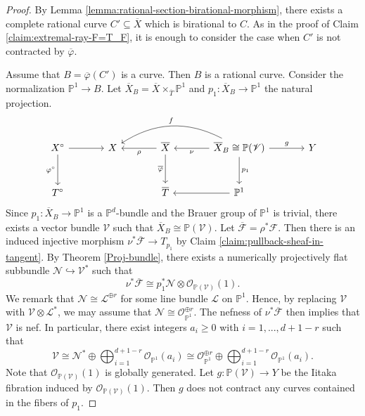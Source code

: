 \documentclass[english,reqno]{amsart}
\newcommand\bbP{{\mathbb P}}
\newcommand\sF{{\mathscr F}}
\newcommand\sG{{\mathscr G}}
\newcommand\sL{{\mathscr L}}
\newcommand\sN{{\mathscr N}}
\newcommand\sO{{\mathscr O}}
\newcommand\sV{{\mathscr V}}
\theoremstyle{plain}
\theoremstyle{definition}
\numberwithin{equation}{section} %
\begin{document}
\begin{proof}
	By Lemma \ref{lemma:rational-section-birational-morphism}, there exists a complete rational curve $C'\subseteq \overline{X}$  which is birational to $C$.  As in the proof of Claim \ref{claim:extremal-ray-F=T_F}, it is enough to consider the case when $C'$ is not contracted by $\overline{\varphi}$.
	
	Assume that $B=\overline{\varphi}(C')$ is a curve. Then $B$ is a rational curve.  Consider the normalization $\bbP^1 \to B$.
	Let $\overline{X}_B = \overline{X}\times_{\overline{T}} \bbP^1$  and $p_1\colon \overline{X}_B\rightarrow \bbP^1$ the natural projection.
	\[\begin{tikzcd}[column sep=large, row sep=large]
	X^\circ \dar[swap]{\varphi^\circ}\rar &
	X & \overline{X} \lar{\rho}\dar[swap]{\overline{\varphi}} & \overline{X}_B \cong\bbP(\sV)\dar{p_1}\lar{\nu}\arrow[bend right]{ll}[swap]{f} \rar{g} & Y \\
	T^\circ & &
	\overline{T} & \bbP^1\lar  &
	\end{tikzcd}\]
	Since $p_1\colon \overline{X}_B\rightarrow \bbP^1$ is a $\bbP^d$-bundle and the Brauer group of $\bbP^1$ is trivial, there exists a vector bundle $\sV$ such that $\overline{X}_B \cong \bbP(\sV)$.
	Let $\overline{\sF}=\rho^*\sF$.
	Then there is an induced injective  morphism $\nu^*\overline{\sF}\rightarrow T_{p_1}$   by Claim \ref{claim:pullback-sheaf-in-tangent}.
	By Theorem \ref{Proj-bundle}, there exists a numerically projectively flat subbundle $\sN\hookrightarrow \sV^*$ such that $$\nu^*\overline{\sF}\cong  p_1^*\sN\otimes\sO_{\bbP(\sV)}(1).$$
	We remark that  $\sN \cong \sL^{\oplus r}$ for some line bundle $\sL$ on $\bbP^1$. Hence, by replacing $\sV$ with $\sV\otimes \sL^*$, we may assume that $\sN\cong \sO_{\bbP^1}^{\oplus r}$.
	The nefness of $\nu^*\overline{\sF}$ then implies that $\sV$ is nef. In particular, there exist  integers $a_i\geqslant 0$ with $i=1,...,d+1-r$ such that
	\[
	\sV  \cong  \sN^*\oplus \bigoplus_{i=1}^{d+1-r}\sO_{\bbP^1}(a_i) \cong  \sO_{\bbP^1}^{\oplus r} \oplus\bigoplus_{i=1}^{d+1-r}\sO_{\bbP^1}(a_i).
	\]
	Note that $\sO_{\bbP(\sV)}(1)$ is globally generated.
	Let $g\colon \bbP(\sV)\rightarrow Y$ be the Iitaka fibration induced by $\sO_{\bbP(\sV)}(1)$. Then $g$ does not contract any curves contained in the fibers of $p_1$.
	

\end{proof}
\end{document}
